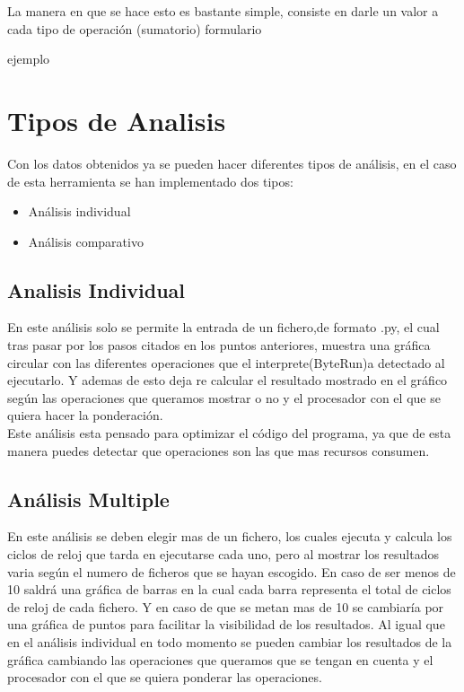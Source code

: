 La manera en que se hace esto es bastante simple, consiste en darle un valor a cada  tipo de operación
(sumatorio)
formulario

ejemplo

\section{Tipos de Analisis}
Con los datos obtenidos ya se pueden hacer diferentes tipos de análisis, en el caso de esta herramienta se han implementado dos tipos:
\begin{itemize}
	\item Análisis individual
	\item Análisis comparativo
\end{itemize}
 

\subsection{Analisis Individual}
En este análisis solo se permite la entrada de un fichero,de formato .py, el cual tras pasar por los pasos citados en los puntos anteriores, muestra una gráfica circular con las diferentes operaciones que el interprete(ByteRun)a detectado al ejecutarlo. Y ademas de esto  deja re calcular el resultado mostrado en el gráfico según las operaciones que queramos mostrar o no y el procesador  con el que se quiera hacer la ponderación.\\

Este análisis esta pensado para optimizar el código del programa, ya que de esta manera puedes detectar que operaciones son las que mas recursos consumen.

\subsection{Análisis Multiple}
En este análisis se deben elegir mas de un fichero, los cuales ejecuta y calcula los ciclos de reloj que tarda en ejecutarse cada uno, pero al mostrar los resultados varia según el numero  de ficheros que  se hayan escogido. En caso de ser menos de 10 saldrá una gráfica de barras en la cual cada barra representa el total de ciclos de reloj de cada fichero. Y en caso de que se metan mas de 10 se cambiaría por una  gráfica de puntos para facilitar la visibilidad de los resultados. Al igual que en el análisis  individual en todo momento se pueden cambiar los resultados  de la gráfica cambiando las operaciones que queramos que se tengan en cuenta y el procesador  con el que se quiera ponderar las operaciones.\\


